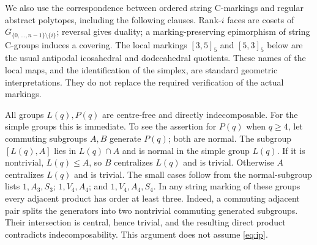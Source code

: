 \documentclass[11pt,a4paper]{article}
\begin{document}
We also use the correspondence between ordered string C-markings and
regular abstract polytopes, including the following clauses. Rank-$i$ faces
are cosets of $G_{\{0,\ldots,n-1\}\setminus\{i\}}$; reversal gives duality;
a marking-preserving epimorphism of string C-groups induces a covering.
The local markings $[3,5]_5$ and $[5,3]_5$ below are the usual antipodal
icosahedral and dodecahedral quotients. These names of the local maps, and the identification of the simplex,
are standard geometric interpretations.
They do not replace the required verification of the actual markings.

All groups $L(q),P(q)$ are centre-free and directly indecomposable. For the
simple groups this is immediate. To see the assertion for $P(q)$ when
$q\ge4$, let commuting subgroups $A,B$ generate $P(q)$; both are normal.
The subgroup $[L(q),A]$ lies in $L(q)\cap A$ and is normal in the simple
group $L(q)$. If it is nontrivial, $L(q)\le A$, so $B$ centralizes $L(q)$
and is trivial. Otherwise $A$ centralizes $L(q)$ and is trivial. The small
cases follow from the normal-subgroup lists
$1,A_3,S_3$; $1,V_4,A_4$; and $1,V_4,A_4,S_4$.
In any string marking of these groups every adjacent product has order
at least three. Indeed, a commuting adjacent pair splits the generators
into two nontrivial commuting generated subgroups. Their intersection is
central, hence trivial, and the resulting direct product contradicts
indecomposability. This argument does not assume \eqref{eq:ip}.
\end{document}

